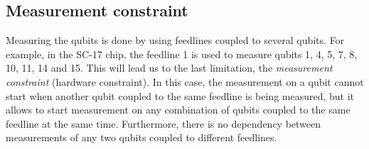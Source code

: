 





     



\subsection{Measurement constraint}
\label{sec:org58adcb1}

Measuring the qubits is done by using feedlines coupled to several qubits.
For example, in the SC-17 chip, the feedline 1 is used to measure qubits 1, 4, 5, 7, 8, 10, 11, 14 and 15. This will lead us to the last limitation, the \emph{measurement constraint} (hardware constraint). In this case, the measurement on a qubit cannot start when
another qubit coupled to the same feedline is being measured, but it
allows to start measurement on any combination of qubits coupled to
the same feedline at the same time.  Furthermore, there is no dependency between
measurements of any two qubits coupled to different feedlines.



